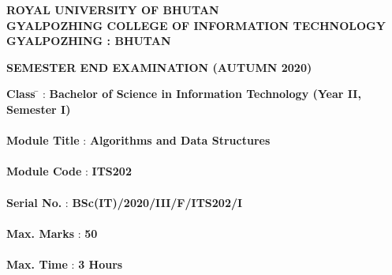 \documentclass[12pt ,a4paper]{exam}
\author{Yonten Jamtsho}
\begin{document}
	\begin{center}
		\textbf{ROYAL UNIVERSITY OF BHUTAN} \\
		\textbf{GYALPOZHING COLLEGE OF INFORMATION TECHNOLOGY} \\
		\textbf{GYALPOZHING : BHUTAN}
	\end{center}
	
	\vspace{0.2cm}
	
	\begin{center}
		\textbf{SEMESTER END EXAMINATION (AUTUMN 2020)}
	\end{center}
	
	\vspace{0.1cm}
	
	\begin{tabbing}
		\textbf{Class} \=  \hspace{2cm} :  \hspace{0.3cm} \textbf{Bachelor of Science in Information Technology (Year II, Semester I)}     \\ \\
		
		\textbf{Module Title} \hspace{0.65cm} : \hspace{0.3cm} \textbf{Algorithms and Data Structures}       \\ \\
		
		\textbf{Module Code} \hspace{0.55cm} :     \hspace{0.3cm} \textbf{ITS202}     \\ \\
		
		\textbf{Serial No.} \hspace{1.13cm} :       \hspace{0.3cm} \textbf{BSc(IT)/2020/III/F/ITS202/I}          \\ \\
		
		\textbf{Max. Marks} \hspace{0.75cm} :     \hspace{0.3cm} \textbf{50}             \\ \\
		
		\textbf{Max. Time} \hspace{1.04cm} :        \hspace{0.3cm} \textbf{3 Hours}             \\ \\
	\end{tabbing}
	
\end{document}
